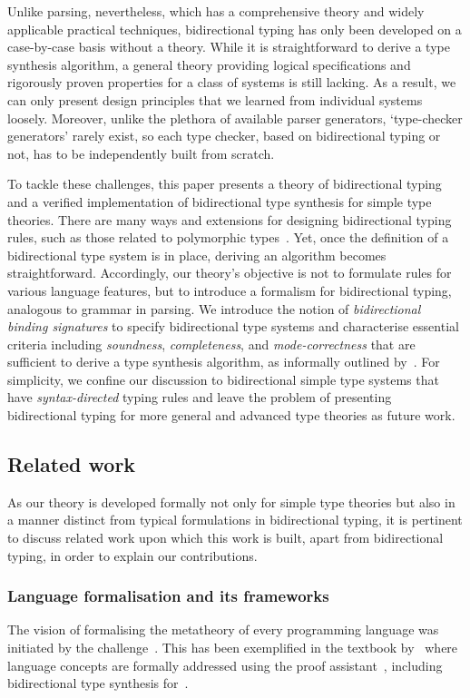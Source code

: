 Unlike parsing, nevertheless, which has a comprehensive theory and widely applicable practical techniques, bidirectional typing has only been developed on a case-by-case basis without a theory.
While it is straightforward to derive a type synthesis algorithm, a general theory providing logical specifications and rigorously proven properties for a class of systems is still lacking.
As a result, we can only present design principles that we learned from individual systems loosely.
Moreover, unlike the plethora of available parser generators, `type-checker generators' rarely exist, so each type checker, based on bidirectional typing or not, has to be independently built from scratch.

To tackle these challenges, this paper presents a theory of bidirectional typing and a verified implementation of bidirectional type synthesis for simple type theories.
There are many ways and extensions for designing bidirectional typing rules, such as those related to polymorphic types~\citep{Pierce2000,Peyton-Jones2007,Dunfield2013,Xie2018}.
Yet, once the definition of a bidirectional type system is in place, deriving an algorithm becomes straightforward.
Accordingly, our theory's objective is not to formulate rules for various language features, but to introduce a formalism for bidirectional typing, analogous to grammar in parsing.
We introduce the notion of \emph{bidirectional binding signatures} to specify bidirectional type systems and characterise essential criteria including \emph{soundness}, \emph{completeness}, and \emph{mode-correctness} that are sufficient to derive a type synthesis algorithm, as informally outlined by~\citet{Dunfield2021}.
For simplicity, we confine our discussion to bidirectional simple type systems that have \emph{syntax-directed} typing rules and leave the problem of presenting bidirectional typing for more general and advanced type theories as future work.

\subsection{Related work}\label{sec:related-work}
As our theory is developed formally not only for simple type theories but also in a manner distinct from typical formulations in bidirectional typing, it is pertinent to discuss related work upon which this work is built, apart from bidirectional typing, in order to explain our contributions.

\subsubsection{Language formalisation and its frameworks} \label{sec:language-formalisation}
The vision of formalising the metatheory of every programming language was initiated by the \PoplMark challenge~\citep{Aydemir2005}.
This has been exemplified in the textbook by~\citet{Wadler2022} where language concepts are formally addressed using the proof assistant~\Agda, including bidirectional type synthesis for~\PCF.

